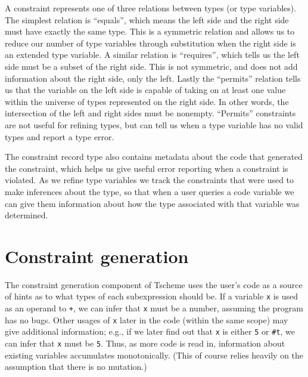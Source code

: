 \documentclass[a4paper]{article}
\begin{document}
A constraint represents one of three relations between types (or type 
variables). The simplest relation is ``equals'', which means the left side and 
the right side must have exactly the same type.  This is a symmetric relation 
and allows us to reduce our number of type variables through substitution when 
the right side is an extended type variable.
A similar relation is ``requires'', which tells us the left side must be a 
subset of the right side.  This is not symmetric, and does not add information 
about the right side, only the left.  Lastly the ``permits'' relation tells us 
that the variable on the left side is capable of taking on at least one value 
within the universe of types represented on the right side.  In other words, 
the intersection of the left and right sides must be nonempty.  ``Permits'' 
constraints are not useful for refining types, but can tell us when a type 
variable has no valid types and report a type error.  

The constraint record type also contains
metadata about the code that generated the constraint, which helps us give 
useful error reporting when a constraint is violated.  As we refine type 
variables we track the constraints that were used to make inferences about the 
type, so that when a user queries a code variable we can give them information 
about how the type associated with that variable was determined.

\section{Constraint generation}

\newcommand{\T}[1]{\texttt{#1}}

The constraint generation component of Tscheme uses the user's code as a source
of hints as to what types of each subexpression should be.  If a variable \T{x}
is used as an operand to \T{+}, we can infer that \T{x} must be a number,
assuming the program has no bugs.  Other usages of \T{x} later in the code
(within the same scope) may give additional information; e.g., if we later find
out that \T{x} is either \T5 or \T{\#t}, we can infer that \T{x} must be \T{5}.
Thus, as more code is read in, information about existing variables accumulates
monotonically.  (This of course relies heavily on the assumption that there is
no mutation.)
\end{document}
